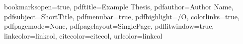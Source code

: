 

\hypersetup
{
bookmarksopen=true,
pdftitle=Example Thesis,
pdfauthor=Author Name,
pdfsubject=ShortTitle, %
pdfmenubar=true, %
pdfhighlight=/O, %
colorlinks=true, %
pdfpagemode=None, %
pdfpagelayout=SinglePage, %
pdffitwindow=true, %
linkcolor=linkcol, %
citecolor=citecol, %
urlcolor=linkcol %
}

\usepackage{draftwatermark} %

%
%

\frontmatter





\newpage
\tableofcontents
\newpage
\renewcommand{\nomname}{List of Symbols}
\printnomenclature[3em]

\mainmatter


\backmatter

%
%



